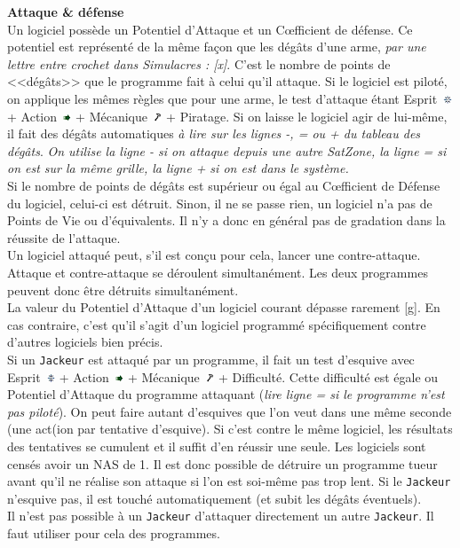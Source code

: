 \documentclass[11pt,twoside,a4paper]{article}
\def\imgESPRI{\includegraphics[width=0.25cm]{../../../../../imgGraphics/rolePlayingGame/SimulacreS/mini12x12/esprit.png} }
\def\imgACTIO{\includegraphics[width=0.25cm]{../../../../../imgGraphics/rolePlayingGame/SimulacreS/mini12x12/action.png} }
\def\imgMECAN{\includegraphics[width=0.25cm]{../../../../../imgGraphics/rolePlayingGame/SimulacreS/mini12x12/mecanique.png} }
\begin{document}
\begin{multicols*}{2}
\textbf{Attaque \& d{\'e}fense}~\\
Un logiciel poss{\`e}de un Potentiel d'Attaque et un C\oe fficient de d{\'e}fense. Ce potentiel est repr{\'e}sent{\'e} de la m{\^e}me fa\c{c}on que les d{\'e}g{\^a}ts d'une arme, \emph{par une lettre entre crochet dans Simulacres : [x]}. C'est le nombre de points de <<d{\'e}g{\^a}ts>> que le programme fait {\`a} celui qu'il attaque. Si le logiciel est pilot{\'e}, on applique les m{\^e}mes r{\`e}gles que pour une arme, le test d'attaque {\'e}tant Esprit~\imgESPRI  + Action~\imgACTIO  + M{\'e}canique~\imgMECAN  + Piratage. Si on laisse le logiciel agir de lui-m{\^e}me, il fait des d{\'e}g{\^a}ts automatiques \emph{{\`a} lire sur les lignes -, = ou + du tableau des d{\'e}g{\^a}ts}. \emph{On utilise la ligne - si on attaque depuis une autre SatZone, la ligne = si on est sur la m{\^e}me grille, la ligne + si on est dans le syst{\`e}me. } ~\\
Si le nombre de points de d{\'e}g{\^a}ts est sup{\'e}rieur ou {\'e}gal au C\oe fficient de D{\'e}fense du logiciel, celui-ci est d{\'e}truit. Sinon, il ne se passe rien, un logiciel n'a pas de Points de Vie ou d'{\'e}quivalents. Il n'y a donc en g{\'e}n{\'e}ral pas de gradation dans la r{\'e}ussite de l'attaque. ~\\
Un logiciel attaqu{\'e} peut, s'il est con\c{c}u pour cela, lancer une contre-attaque. Attaque et contre-attaque se d{\'e}roulent simultan{\'e}ment. Les deux programmes peuvent donc {\^e}tre d{\'e}truits simultan{\'e}ment. ~\\
La valeur du Potentiel d'Attaque d'un logiciel courant d{\'e}passe rarement [g]. En cas contraire, c'est qu'il s'agit d'un logiciel programm{\'e} sp{\'e}cifiquement contre d'autres logiciels bien pr{\'e}cis. ~\\
Si un \texttt{Jackeur} est attaqu{\'e} par un programme, il fait un test d'esquive avec Esprit~\imgESPRI  + Action~\imgACTIO  + M{\'e}canique~\imgMECAN  + Difficult{\'e}. Cette difficult{\'e} est {\'e}gale ou Potentiel d'Attaque du programme attaquant (\emph{lire ligne = si le programme n'est pas pilot{\'e}}). On peut faire autant d'esquives que l'on veut dans une m{\^e}me seconde (une act(ion par tentative d'esquive). Si c'est contre le m{\^e}me logiciel, les r{\'e}sultats des tentatives se cumulent et il suffit d'en r{\'e}ussir une seule. Les logiciels sont cens{\'e}s avoir un NAS de 1. Il est donc possible de d{\'e}truire un programme tueur avant qu'il ne r{\'e}alise son attaque si l'on est soi-m{\^e}me pas trop lent. Si le \texttt{Jackeur} n'esquive pas, il est touch{\'e} automatiquement (et subit les d{\'e}g{\^a}ts {\'e}ventuels). ~\\
Il n'est pas possible {\`a} un \texttt{Jackeur} d'attaquer directement un autre \texttt{Jackeur}. Il faut utiliser pour cela des programmes. ~\\


\end{multicols*}
\end{document}

